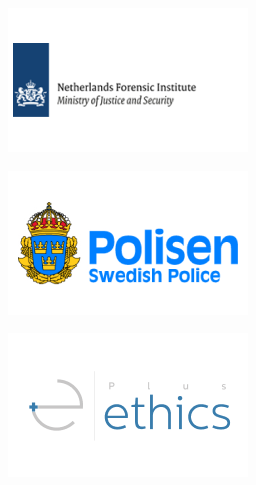 \documentclass{beamer}
\begin{document}
\begin{frame}
{{\begin{minipage}{.15\textwidth}\includegraphics[width=\columnwidth]{../img/logo_nfi.png}\end{minipage}%
\begin{minipage}{.15\textwidth}\includegraphics[width=\columnwidth]{../img/logo_pol.png}\end{minipage}%
\begin{minipage}{.15\textwidth}\includegraphics[width=\columnwidth]{../img/logo_plusethics.png}\end{minipage}%
}}
\end{frame}
\end{document}
